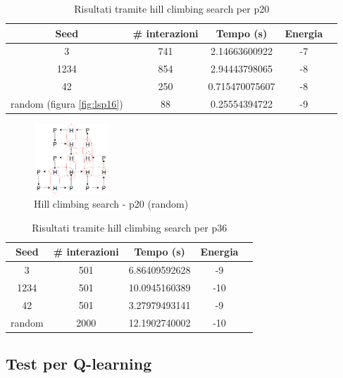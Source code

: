 \documentclass[conference]{IEEEtran}
\begin{document}
\begin{table}[H]
\begin{center}
\begin{tabular}{|c|c|c|c|c|}
\hline
\textbf{Seed} & \textbf{\# interazioni} & \textbf{Tempo (s)} & \textbf{Energia} \\ \hline
3 & 741 & 2.14663600922 & -7 \\ \hline
1234 & 854 & 2.94443798065 & -8 \\ \hline
42 & 250 & 0.715470075607 & -8 \\ \hline
random (figura \ref{fig:lsp16}) & 88 & 0.25554394722 & -9 \\ \hline
\end{tabular}
\end{center}
\caption{Risultati tramite hill climbing search per p20}
\end{table}

\begin{figure}[H]
\centering
\includegraphics[width=0.25\textwidth]{figure/LSp20.png}
\caption{Hill climbing search - p20 (random)}
\label{fig:lsp20}
\end{figure}

\begin{table}[H]
\begin{center}
\begin{tabular}{|c|c|c|c|c|}
\hline
\textbf{Seed} & \textbf{\# interazioni} & \textbf{Tempo (s)} & \textbf{Energia} \\ \hline
3 & 501 & 6.86409592628 & -9 \\ \hline
1234 & 501 & 10.0945160389 & -10 \\ \hline
42 & 501 & 3.27979493141 & -9 \\ \hline
random & 2000 & 12.1902740002 & -10 \\ \hline
\end{tabular}
\end{center}
\caption{Risultati tramite hill climbing search per p36}
\end{table}

\subsection{Test per Q-learning}
\end{document}
